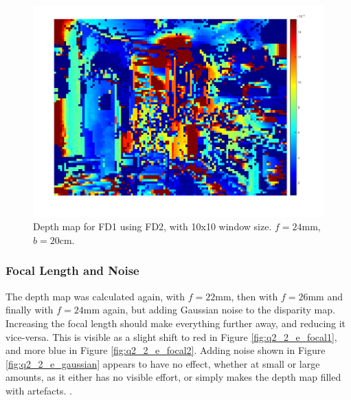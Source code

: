 \documentclass[a4paper, 10pt, conference]{ieeeconf}
\begin{document}
\begin{figure}[!ht]
  \centering
  \includegraphics[width=\linewidth]{pic/q2_2_cd4_depth}
	\caption{Depth map for FD1 using FD2, with 10x10 window size. $f = 24\text{mm}$, $b = 20\text{cm}$.}
  \label{fig:depth}
\end{figure}

\subsubsection{Focal Length and Noise}

The depth map was calculated again, with $f = 22\text{mm}$, then with $f = 26\text{mm}$ and finally with $f = 24\text{mm}$ again, but adding Gaussian noise to the disparity map. Increasing the focal length should make everything further away, and reducing it vice-versa. This is visible as a slight shift to red in Figure \ref{fig:q2_2_e_focal1}, and more blue in Figure \ref{fig:q2_2_e_focal2}. Adding noise shown in Figure \ref{fig:q2_2_e_gaussian} appears to have no effect, whether at small or large amounts, as it either has no visible effort, or simply makes the depth map filled with artefacts. .
\end{document}
